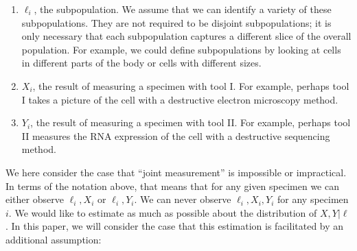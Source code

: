 \begin{enumerate}
\item $\ell_i$, the subpopulation.  We assume that we can identify a variety of these subpopulations.  They are not required to be disjoint subpopulations; it is only necessary that each subpopulation captures a different slice of the overall population.  For example, we could define subpopulations by looking at cells in different parts of the body or cells with different sizes.  
\item $X_i$, the result of measuring a specimen with tool I.  For example, perhaps tool I takes a picture of the cell with a destructive electron microscopy method.
\item $Y_i$, the result of measuring a specimen with tool II.  For example, perhaps tool II measures the RNA expression of the cell with a destructive sequencing method.
\end{enumerate}

We here consider the case that ``joint measurement'' is impossible or impractical.  In terms of the notation above, that means that for any given specimen we can either observe $\ell_i, X_i$ or $\ell_i,Y_i$.  We can never observe $\ell_i,X_i,Y_i$ for any specimen $i$.  We would like to estimate as much as possible about the distribution of $X,Y|\ell$.  In this paper, we will consider the case that this estimation is facilitated by an additional assumption:


\begin{center}
\end{center}

